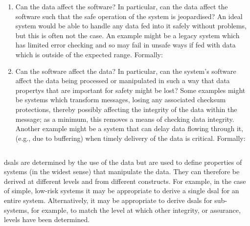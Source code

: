 \begin{enumerate}
  \item Can the data affect the software? In particular, can the data affect the software such that the safe operation of the system is jeopardised? An ideal system would be able to handle any data fed into it safely without problems, but this is often not the case. An example might be a legacy system which has limited error checking and so may fail in unsafe ways if fed with data which is outside of the expected range. Formally: 
  \item Can the software affect the data? In particular, can the system's software affect the data being processed or manipulated in such a way that \glspl{data property} that are important for safety might be lost? Some examples might be systems which transform messages, losing any associated checksum protections, thereby possibly affecting the \gls{integrity} of the data within the message; as a minimum, this removes a means of checking data \gls{integrity}. Another example might be a system that can delay data flowing through it, (e.g., due to buffering) when timely delivery of the data is critical. Formally:\ 
\end{enumerate}

\subsection{}\label{bkm:activities:analyse:tailoring}
\cbstart\glspl{dsal} are determined by the use of the data but are used to define properties of systems (in the widest sense) that manipulate the data. They can therefore be derived at different levels and from different constructs. For example, in the case of simple, low-risk systems it may be appropriate to derive a single \gls{dsal} for an entire system. Alternatively, it may be appropriate to derive \glspl{dsal} for sub-systems, for example, to match the level at which other \gls{integrity}, or assurance, levels have been determined.\cbend

